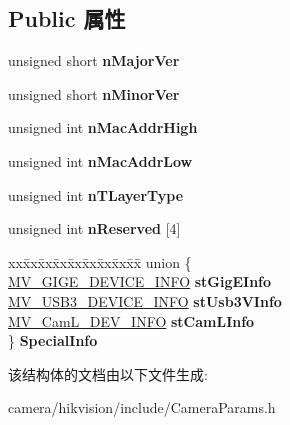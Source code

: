 \subsection*{Public 属性}
\begin{DoxyCompactItemize}
\item 
\mbox{\label{struct___m_v___c_c___d_e_v_i_c_e___i_n_f_o___a2f0773023a30eb4f4c566b77325c81f6}} 
unsigned short {\bfseries n\+Major\+Ver}
\item 
\mbox{\label{struct___m_v___c_c___d_e_v_i_c_e___i_n_f_o___a2fc3088e0c5ece78830fa3109ff1a8cf}} 
unsigned short {\bfseries n\+Minor\+Ver}
\item 
\mbox{\label{struct___m_v___c_c___d_e_v_i_c_e___i_n_f_o___a3d7fa64d79affd9791b80404e15fe002}} 
unsigned int {\bfseries n\+Mac\+Addr\+High}
\item 
\mbox{\label{struct___m_v___c_c___d_e_v_i_c_e___i_n_f_o___a72d31babc7667c0f59c4c6c8b63c3d5e}} 
unsigned int {\bfseries n\+Mac\+Addr\+Low}
\item 
\mbox{\label{struct___m_v___c_c___d_e_v_i_c_e___i_n_f_o___a3f584638615b808872a94355c3e51571}} 
unsigned int {\bfseries n\+T\+Layer\+Type}
\item 
\mbox{\label{struct___m_v___c_c___d_e_v_i_c_e___i_n_f_o___a6ab03682fe39ec564a6b9d23a8572fd6}} 
unsigned int {\bfseries n\+Reserved} \mbox{[}4\mbox{]}
\item 
\mbox{\label{struct___m_v___c_c___d_e_v_i_c_e___i_n_f_o___ad63551e42e627dae681fcf82056cd066}} 
\begin{tabbing}
xx\=xx\=xx\=xx\=xx\=xx\=xx\=xx\=xx\=\kill
union \{\\
\>\hyperlink{struct___m_v___g_i_g_e___d_e_v_i_c_e___i_n_f_o__}{MV\_GIGE\_DEVICE\_INFO} {\bfseries stGigEInfo}\\
\>\hyperlink{struct___m_v___u_s_b3___d_e_v_i_c_e___i_n_f_o__}{MV\_USB3\_DEVICE\_INFO} {\bfseries stUsb3VInfo}\\
\>\hyperlink{struct___m_v___cam_l___d_e_v___i_n_f_o__}{MV\_CamL\_DEV\_INFO} {\bfseries stCamLInfo}\\
\} {\bfseries SpecialInfo}\\

\end{tabbing}\end{DoxyCompactItemize}


该结构体的文档由以下文件生成\+:\begin{DoxyCompactItemize}
\item 
camera/hikvision/include/Camera\+Params.\+h\end{DoxyCompactItemize}
